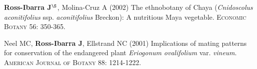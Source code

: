 \documentclass[letterpaper,10pt]{article}
\renewenvironment{itemize}{
  \begin{list}{}{
    \setlength{\leftmargin}{1.5em}
  }
}{
  \end{list}
}
\begin{document}
\begin{etaremune}
\item {\bf Ross-Ibarra J}$^\S$, Molina-Cruz A (2002) The ethnobotany of Chaya (\emph{Cnidoscolus aconitifolius} ssp. \emph{aconitifolius} Breckon): A nutritious Maya vegetable. \textsc{Economic Botany} 56: 350-365.

\item  Neel MC, {\bf Ross-Ibarra J}, Ellstrand NC (2001) Implications of mating patterns for conservation of the endangered plant \emph{Eriogonum ovalifolium} var. \emph{vineum}.  \textsc{American Journal of Botany} 88: 1214-1222.
\end{etaremune}


\end{document}
